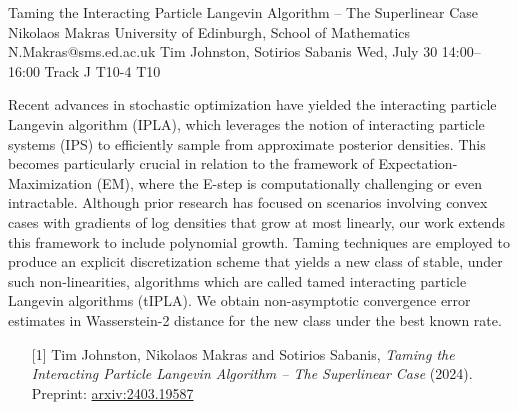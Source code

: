 \begin{talk}
\end{talk}
\begin{talk}
  {Taming the Interacting Particle Langevin Algorithm – The Superlinear Case}%
  {Nikolaos Makras}%
  {University of Edinburgh, School of Mathematics}%
  {N.Makras@sms.ed.ac.uk}%
  {Tim Johnston, Sotirios Sabanis}%
  {}%
  {Wed, July 30 14:00–16:00 Track J}%
  {T10-4}%
  {T10}%
			
Recent advances in stochastic optimization have yielded the interacting particle Langevin algorithm (IPLA), which leverages the notion of interacting particle systems (IPS) to efficiently sample from approximate posterior densities. This becomes particularly crucial in relation to the framework of Expectation-Maximization (EM), where the E-step is computationally challenging or even intractable. Although prior research has focused on scenarios involving convex cases with gradients of log densities that grow at most linearly, our work extends this framework to include polynomial growth. Taming techniques are employed to produce an explicit discretization scheme that yields a new class of stable, under such non-linearities, algorithms which are called tamed interacting particle Langevin algorithms (tIPLA). We obtain non-asymptotic convergence error estimates in Wasserstein-2 distance for the new class under the best known rate. 

\medskip

\begin{enumerate}
	\item[{[1]}] Tim Johnston, Nikolaos Makras and Sotirios Sabanis, {\it Taming the Interacting Particle Langevin Algorithm – The Superlinear Case} (2024). Preprint: \href{https://arxiv.org/abs/2403.19587}{arxiv:2403.19587} 
\end{enumerate}

\end{talk}
